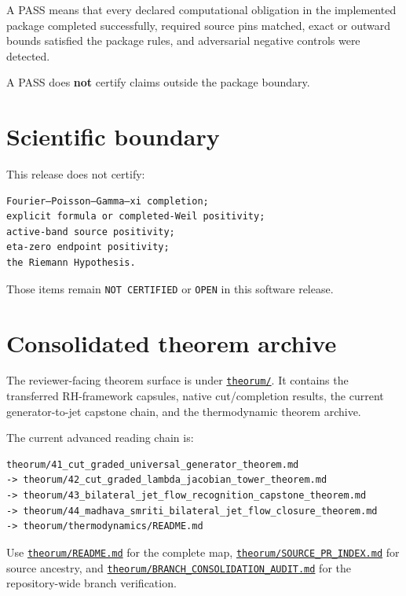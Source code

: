 A PASS means that every declared computational obligation in the implemented package completed successfully, required source pins matched, exact or outward bounds satisfied the package rules, and adversarial negative controls were detected.

A PASS does \textbf{not} certify claims outside the package boundary.

\hypertarget{scientific-boundary}{%
\section{Scientific boundary}\label{scientific-boundary}}

This release does not certify:

\begin{verbatim}
Fourier–Poisson–Gamma–xi completion;
explicit formula or completed-Weil positivity;
active-band source positivity;
eta-zero endpoint positivity;
the Riemann Hypothesis.
\end{verbatim}

Those items remain \texttt{NOT\ CERTIFIED} or \texttt{OPEN} in this software release.

\hypertarget{consolidated-theorem-archive}{%
\section{Consolidated theorem archive}\label{consolidated-theorem-archive}}

The reviewer-facing theorem surface is under \href{theorum/}{\texttt{theorum/}}. It contains the transferred RH-framework capsules, native cut/completion results, the current generator-to-jet capstone chain, and the thermodynamic theorem archive.

The current advanced reading chain is:

\begin{verbatim}
theorum/41_cut_graded_universal_generator_theorem.md
-> theorum/42_cut_graded_lambda_jacobian_tower_theorem.md
-> theorum/43_bilateral_jet_flow_recognition_capstone_theorem.md
-> theorum/44_madhava_smriti_bilateral_jet_flow_closure_theorem.md
-> theorum/thermodynamics/README.md
\end{verbatim}

Use \href{theorum/README.md}{\texttt{theorum/README.md}} for the complete map, \href{theorum/SOURCE_PR_INDEX.md}{\texttt{theorum/SOURCE\_PR\_INDEX.md}} for source ancestry, and \href{theorum/BRANCH_CONSOLIDATION_AUDIT.md}{\texttt{theorum/BRANCH\_CONSOLIDATION\_AUDIT.md}} for the repository-wide branch verification.

